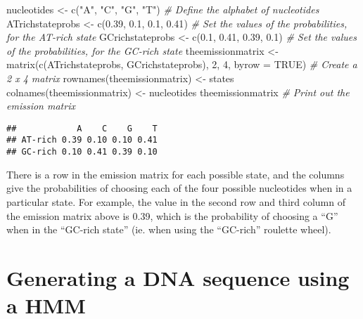 \documentclass[
]{book}
\newenvironment{Shaded}{\begin{snugshade}}{\end{snugshade}}
\newcommand{\AttributeTok}[1]{\textcolor[rgb]{0.77,0.63,0.00}{#1}}
\newcommand{\CommentTok}[1]{\textcolor[rgb]{0.56,0.35,0.01}{\textit{#1}}}
\newcommand{\ConstantTok}[1]{\textcolor[rgb]{0.00,0.00,0.00}{#1}}
\newcommand{\DecValTok}[1]{\textcolor[rgb]{0.00,0.00,0.81}{#1}}
\newcommand{\FloatTok}[1]{\textcolor[rgb]{0.00,0.00,0.81}{#1}}
\newcommand{\FunctionTok}[1]{\textcolor[rgb]{0.00,0.00,0.00}{#1}}
\newcommand{\NormalTok}[1]{#1}
\newcommand{\OtherTok}[1]{\textcolor[rgb]{0.56,0.35,0.01}{#1}}
\newcommand{\StringTok}[1]{\textcolor[rgb]{0.31,0.60,0.02}{#1}}
\begin{document}
\begin{Shaded}
\begin{Highlighting}[]
\NormalTok{nucleotides         }\OtherTok{\textless{}{-}} \FunctionTok{c}\NormalTok{(}\StringTok{"A"}\NormalTok{, }\StringTok{"C"}\NormalTok{, }\StringTok{"G"}\NormalTok{, }\StringTok{"T"}\NormalTok{)   }\CommentTok{\# Define the alphabet of nucleotides}
\NormalTok{ATrichstateprobs    }\OtherTok{\textless{}{-}} \FunctionTok{c}\NormalTok{(}\FloatTok{0.39}\NormalTok{, }\FloatTok{0.1}\NormalTok{, }\FloatTok{0.1}\NormalTok{, }\FloatTok{0.41}\NormalTok{) }\CommentTok{\# Set the values of the probabilities, for the AT{-}rich state}
\NormalTok{GCrichstateprobs    }\OtherTok{\textless{}{-}} \FunctionTok{c}\NormalTok{(}\FloatTok{0.1}\NormalTok{, }\FloatTok{0.41}\NormalTok{, }\FloatTok{0.39}\NormalTok{, }\FloatTok{0.1}\NormalTok{) }\CommentTok{\# Set the values of the probabilities, for the GC{-}rich state}
\NormalTok{theemissionmatrix }\OtherTok{\textless{}{-}} \FunctionTok{matrix}\NormalTok{(}\FunctionTok{c}\NormalTok{(ATrichstateprobs, GCrichstateprobs), }\DecValTok{2}\NormalTok{, }\DecValTok{4}\NormalTok{, }\AttributeTok{byrow =} \ConstantTok{TRUE}\NormalTok{) }\CommentTok{\# Create a 2 x 4 matrix}
\FunctionTok{rownames}\NormalTok{(theemissionmatrix) }\OtherTok{\textless{}{-}}\NormalTok{ states}
\FunctionTok{colnames}\NormalTok{(theemissionmatrix) }\OtherTok{\textless{}{-}}\NormalTok{ nucleotides}
\NormalTok{theemissionmatrix                              }\CommentTok{\# Print out the emission matrix}
\end{Highlighting}
\end{Shaded}

\begin{verbatim}
##            A    C    G    T
## AT-rich 0.39 0.10 0.10 0.41
## GC-rich 0.10 0.41 0.39 0.10
\end{verbatim}

There is a row in the emission matrix for each possible state, and the columns give the probabilities of choosing each of the four possible nucleotides when in a particular state. For example, the value in the second row and third column of the emission matrix above is 0.39, which is the probability of choosing a ``G'' when in the ``GC-rich state'' (ie. when using the ``GC-rich'' roulette wheel).

\hypertarget{generating-a-dna-sequence-using-a-hmm}{%
\section{Generating a DNA sequence using a HMM}\label{generating-a-dna-sequence-using-a-hmm}}
\end{document}
